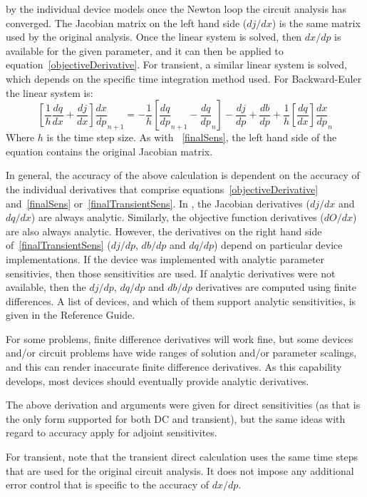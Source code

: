 by the individual device models once the Newton loop the circuit analysis has 
converged.  The Jacobian matrix on the left hand side ($dj/dx$) is the same matrix 
used by the original analysis.  Once the linear system is solved, then $dx/dp$ is
available for the given parameter, and it can then be applied to equation~\ref{objectiveDerivative}.
For transient, a similar linear system is solved, which depends on the specific
time integration method used.  For Backward-Euler the linear system is:
\begin{equation}
  \left[ \frac{1}{h} \frac{dq}{dx} 
  + \frac{dj}{dx} \right] \frac{dx}{dp}_{n+1} 
 =
  -\frac{1}{h} \left[ \frac{dq}{dp}_{n+1} - \frac{dq}{dp}_n \right] 
 - \frac{dj}{dp} 
 + \frac{db}{dp} 
 + \frac{1}{h} \left[ \frac{dq}{dx} \right] \frac{dx}{dp}_n 
 \label{finalTransientSens}
\end{equation}
\noindent Where $h$ is the time step size.  As with ~\ref{finalSens}, the left hand side 
of the equation contains the original Jacobian matrix.

In general, the accuracy of the above calculation is dependent on the accuracy of the 
individual derivatives that comprise equations~\ref{objectiveDerivative} and~\ref{finalSens} 
or~\ref{finalTransientSens}.
In \Xyce{}, the Jacobian derivatives ($dj/dx$ and $dq/dx$) are always analytic.  Similarly, the
objective function derivatives ($dO/dx$) are also always analytic.  However, the derivatives
on the right hand side of~\ref{finalTransientSens} ($dj/dp$, $db/dp$ and $dq/dp$) depend on particular
device implementations.  If the device was implemented with analytic parameter sensitivies,
then those sensitivities are used.  If analytic derivatives were not available, then
the $dj/dp$, $dq/dp$ and $db/dp$ derivatives are computed using finite differences.  
A list of \Xyce{} devices, and which of them support analytic sensitivities, is given in the \Xyce{} Reference 
Guide\ReferenceGuide{}.

For some problems, finite difference derivatives will work fine, but some devices and/or circuit
problems have wide ranges of solution and/or parameter scalings, and this can render inaccurate 
finite difference derivatives.  As this capability develops, most devices should
eventually provide analytic derivatives.

The above derivation and arguments were given for direct sensitivities (as that is the only
form supported for both DC and transient), but the same 
ideas with regard to accuracy apply for adjoint sensitivites.

For transient, note that the transient direct calculation uses the same time steps 
that are used for the original circuit analysis.  It does not impose any additional error
control that is specific to the accuracy of $dx/dp$.



